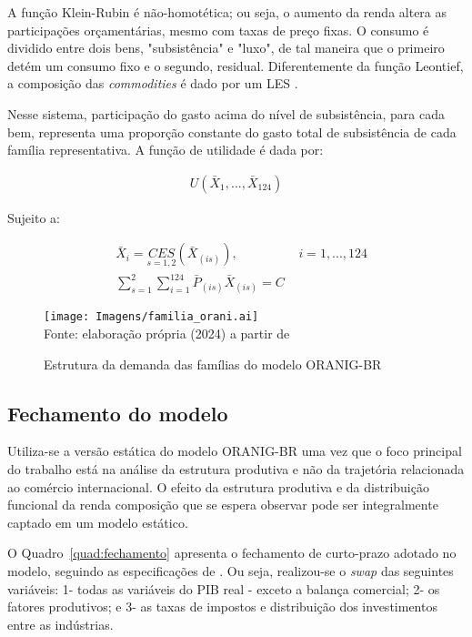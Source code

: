 A função Klein-Rubin é não-homotética; ou seja, o aumento da renda altera as participações orçamentárias, mesmo com taxas de preço fixas. O consumo é dividido entre dois bens, "subsistência" e "luxo", de tal maneira que o primeiro detém um consumo fixo e o segundo, residual. Diferentemente da função Leontief, a composição das \textit{commodities} é dado por um LES \cite{horridge03}.

Nesse sistema, participação do gasto acima do nível de subsistência, para cada bem, representa uma proporção constante do gasto total de subsistência de cada família representativa. A função de utilidade é dada por:

\begin{align*}
	U(\bar{X}_1, ... , \bar{X}_{124})
\end{align*}

Sujeito a:

\begin{align}
	&\bar{X}_i = \underset{s = 1, 2}{CES} (\bar{X}_{(is)}), \hspace{2cm} i = 1, ... , 124 \\
	&\sum_{s = 1}^{2} \sum_{i = 1}^{124} \bar{P}_{(is)} \bar{X}_{(is)} = C
\end{align}

\begin{landscape}
	\begin{figure}
		\centering
		\caption{Estrutura da demanda das famílias do modelo ORANIG-BR} \label{fig:estrutura_familia}
		\texttt{[image: Imagens/familia\_orani.ai]}
		\footnotesize \\
		Fonte: elaboração própria (2024) a partir de \textcite{horridge03}
	\end{figure}
\end{landscape}

\subsection{Fechamento do modelo} \label{subsec:fechamento}

Utiliza-se a versão estática do modelo ORANIG-BR uma vez que o foco principal do trabalho está na análise da estrutura produtiva e não da trajetória relacionada ao comércio internacional. O efeito da estrutura produtiva e da distribuição funcional da renda composição que se espera observar pode ser integralmente captado em um modelo estático.

O Quadro~\ref{quad:fechamento} apresenta o fechamento de curto-prazo adotado no modelo, seguindo as especificações de \textcite{horridge03}. Ou seja, realizou-se o \textit{swap} das seguintes variáveis: 1- todas as variáveis do PIB real - exceto a balança comercial; 2- os fatores produtivos; e 3- as taxas de impostos e distribuição dos investimentos entre as indústrias.

